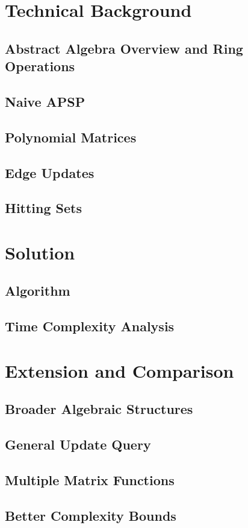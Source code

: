 \documentclass[12pt]{article}
\begin{document}
\section{Technical Background}
\subsection{Abstract Algebra Overview and Ring Operations}
\subsection{Naive APSP}
\subsection{Polynomial Matrices}
\subsection{Edge Updates}
\subsection{Hitting Sets}

\section{Solution}
\subsection{Algorithm}
\subsection{Time Complexity Analysis}

\section{Extension and Comparison}
\subsection{Broader Algebraic Structures}
\subsection{General Update Query}
\subsection{Multiple Matrix Functions}
\subsection{Better Complexity Bounds}
\end{document}
